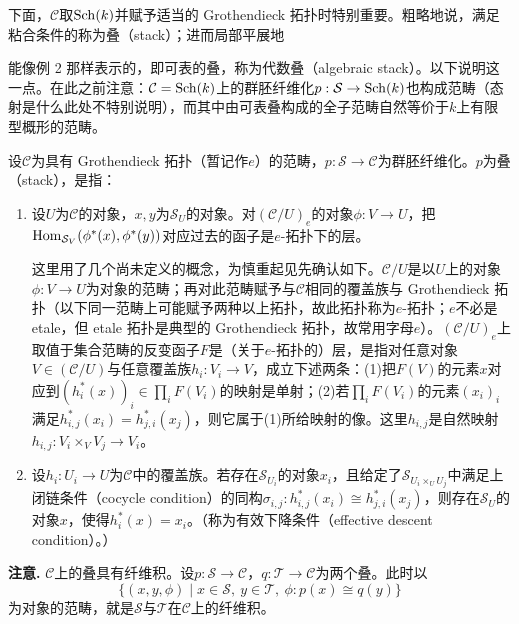 下面，$\mathcal{C}$取$\operatorname{Sch}(k)$并赋予适当的 Grothendieck 拓扑时特别重要。粗略地说，满足粘合条件的称为叠（stack）；进而局部平展地

能像例 2 那样表示的，即可表的叠，称为代数叠（algebraic stack）。以下说明这一点。在此之前注意：$\mathcal{C}=\operatorname{Sch}(k)$上的群胚纤维化$p:\mathcal{S}\to\operatorname{Sch}(k)$也构成范畴（态射是什么此处不特别说明），而其中由可表叠构成的全子范畴自然等价于$k$上有限型概形的范畴。


\begin{definition}[stack]
设$\mathcal{C}$为具有 Grothendieck 拓扑（暂记作$e$）的范畴，$p:\mathcal{S}\to\mathcal{C}$为群胚纤维化。$p$为叠（stack），是指：
\begin{enumerate}[label=(\arabic*)]
\item 设$U$为$\mathcal{C}$的对象，$x,y$为$\mathcal{S}_U$的对象。对$(\mathcal{C}/U)_e$的对象$\phi:V\to U$，把$\operatorname{Hom}_{\mathcal{S}_V}(\phi^*(x),\phi^*(y))$对应过去的函子是$e$-拓扑下的层。

这里用了几个尚未定义的概念，为慎重起见先确认如下。$\mathcal{C}/U$是以$U$上的对象$\phi:V\to U$为对象的范畴；再对此范畴赋予与$\mathcal{C}$相同的覆盖族与 Grothendieck 拓扑（以下同一范畴上可能赋予两种以上拓扑，故此拓扑称为$e$-拓扑；$e$不必是 etale，但 etale 拓扑是典型的 Grothendieck 拓扑，故常用字母$e$）。$(\mathcal{C}/U)_e$上取值于集合范畴的反变函子$F$是（关于$e$-拓扑的）层，是指对任意对象$V\in(\mathcal{C}/U)$与任意覆盖族$h_i:V_i\to V$，成立下述两条：(1)把$F(V)$的元素$x$对应到$(h_i^*(x))_i\in\prod_iF(V_i)$的映射是单射；(2)若$\prod_iF(V_i)$的元素$(x_i)_i$满足$h_{i,j}^*(x_i)=h_{j,i}^*(x_j)$，则它属于(1)所给映射的像。这里$h_{i,j}$是自然映射$h_{i,j}:V_i\times_VV_j\to V_i$。
\item 设$h_i:U_i\to U$为$\mathcal{C}$中的覆盖族。若存在$\mathcal{S}_{U_i}$的对象$x_i$，且给定了$\mathcal{S}_{U_i\times_UU_j}$中满足上闭链条件（cocycle condition）的同构$\sigma_{i,j}:h_{i,j}^*(x_i)\cong h_{j,i}^*(x_j)$，则存在$\mathcal{S}_U$的对象$x$，使得$h_i^*(x)=x_i$。（称为有效下降条件（effective descent condition）。）
\end{enumerate}
\end{definition}

\medskip
\noindent\textbf{注意.}
$\mathcal{C}$上的叠具有纤维积。设$p:\mathcal{S}\to\mathcal{C}$，$q:\mathcal{T}\to\mathcal{C}$为两个叠。此时以
\[
\{(x,y,\phi)\mid x\in\mathcal{S},\ y\in\mathcal{T},\ \phi:p(x)\cong q(y)\}
\]
为对象的范畴，就是$\mathcal{S}$与$\mathcal{T}$在$\mathcal{C}$上的纤维积。

